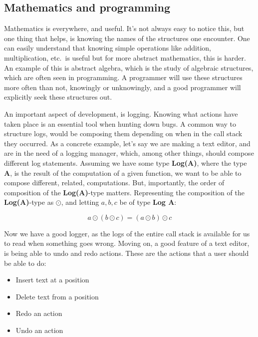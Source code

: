 \subsection{Mathematics and programming}

Mathematics is everywhere, and useful. It's not always easy to notice this, but
one thing that helps, is knowing the names of the structures one encounter. One
can easily understand that knowing simple operations like addition,
multiplication, etc.\ is useful but for more abstract mathematics, this is
harder. An example of this is abstract algebra, which is the study of algebraic
structures, which are often seen in programming. A programmer will use these
structures more often than not, knowingly or unknowingly, and a good programmer
will explicitly seek these structures out.

An important aspect of development, is logging. Knowing what actions have taken
place is an essential tool when hunting down bugs. A common way to structure
logs, would be composing them depending on when in the call stack they occurred.
As a concrete example, let's say we are making a text editor, and are in the
need of a logging manager, which, among other things, should compose different
log statements. Assuming we have some type \textbf{Log(A)}, where the type
\textbf{A}, is the result of the computation of a given function, we want to be
able to compose different, related, computations. But, importantly, the order of
composition of the \textbf{Log(A)}-type matters. Representing the composition of
the \textbf{Log(A)}-type as $\odot$, and letting $a, b, c$ be of type
\textbf{Log A}:

\begin{definition} \label{def:logComp}
  \begin{equation}
    a \odot \left ( b \odot c \right ) = \left ( a \odot b \right ) \odot c
  \end{equation}
\end{definition}

Now we have a good logger, as the logs of the entire call stack is available for
us to read when something goes wrong. Moving on, a good feature of a text
editor, is being able to undo and redo actions. These are the actions that a
user should be able to do:

\begin{itemize}
  \item Insert text at a position
  \item Delete text from a position
  \item Redo an action
  \item Undo an action
\end{itemize}

